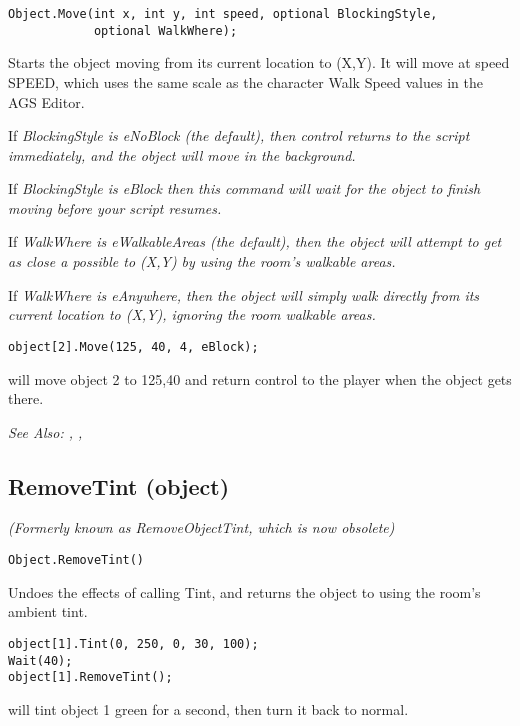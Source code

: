 \begin{verbatim}
Object.Move(int x, int y, int speed, optional BlockingStyle,
            optional WalkWhere);
\end{verbatim}
Starts the object moving from its current location to (X,Y). It will
move at speed SPEED, which uses the same scale as the character Walk Speed
values in the AGS Editor.

If \it{BlockingStyle} is eNoBlock (the default), then control returns to the script
immediately, and the object will move in the background.

If \it{BlockingStyle} is eBlock then this command will wait for the object
to finish moving before your script resumes.

If \it{WalkWhere} is eWalkableAreas (the default), then the object will attempt to
get as close a possible to (X,Y) by using the room's walkable areas.

If \it{WalkWhere} is eAnywhere, then the object will simply walk directly from its
current location to (X,Y), ignoring the room walkable areas.

\begin{verbatim}
object[2].Move(125, 40, 4, eBlock);
\end{verbatim}
will move object 2 to 125,40 and return control to the player when the object gets there.

\it{See Also:} , ,



\subsection{RemoveTint (object)}\label{Object.RemoveTint}%

\it{(Formerly known as RemoveObjectTint, which is now obsolete)}

\begin{verbatim}
Object.RemoveTint()
\end{verbatim}

Undoes the effects of calling Tint, and returns the object to using the room's ambient tint.

\begin{verbatim}
object[1].Tint(0, 250, 0, 30, 100);
Wait(40);
object[1].RemoveTint();
\end{verbatim}
will tint object 1 green for a second, then turn it back to normal.

